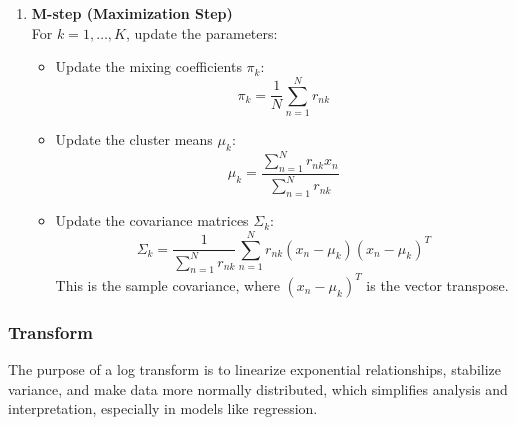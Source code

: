 \begin{definition}
\begin{enumerate}
\begin{enumerate}
            \item \textbf{M-step (Maximization Step)} \\
            For \( k = 1, \dots, K \), update the parameters:
            \begin{itemize}
                \item Update the mixing coefficients \( \pi_k \):
                \[
                \pi_k = \frac{1}{N} \sum_{n=1}^{N} r_{nk}
                \]
    
                \item Update the cluster means \( \mu_k \):
                \[
                \mu_k = \frac{\sum_{n=1}^{N} r_{nk} x_n}{\sum_{n=1}^{N} r_{nk}}
                \]
    
                \item Update the covariance matrices \( \Sigma_k \):
                \[
                \Sigma_k = \frac{1}{\sum_{n=1}^{N} r_{nk}} \sum_{n=1}^{N} r_{nk} (x_n - \mu_k)(x_n - \mu_k)^T
                \]
                This is the sample covariance, where \( (x_n - \mu_k)^T \) is the vector transpose.
            \end{itemize}
        \end{enumerate}
    
    \end{enumerate}    
\end{definition}

\subsubsection{Transform}
\begin{intuition}
    The purpose of a log transform is to linearize exponential relationships, stabilize variance, and make data more normally distributed, which simplifies analysis and interpretation, especially in models like regression.
\end{intuition}

